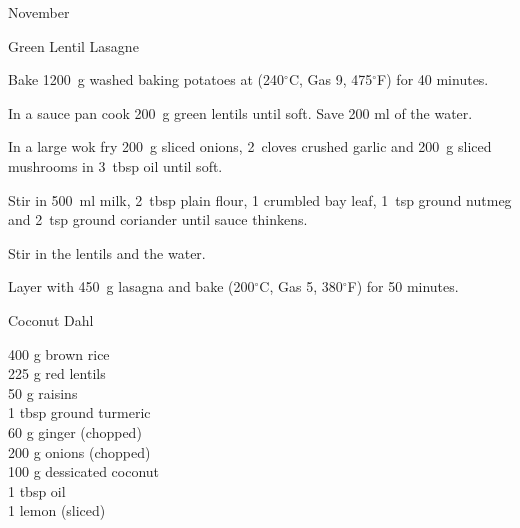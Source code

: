 \begin{menu}{November}
\begin{recipe}{2}{Green Lentil Lasagne}
    \begin{instructions}
    \item 
    Bake
    1200~g washed baking potatoes
    at
    (240$^{\circ}$C, Gas 9, 475$^{\circ}$F) for 40 minutes.
  \item 
        In a sauce pan cook
        200~g  green lentils
        until soft.
        Save 200 ml of the water.
      \item 
        In a large wok fry
        200~g sliced onions,
        2~cloves crushed garlic
        and
        200~g sliced mushrooms
        in
        3~tbsp  oil
        until soft.
      \item 
        Stir in
        500~ml  milk,
        2~tbsp  plain flour,
        1 crumbled bay leaf,
        1~tsp  ground nutmeg
        and
        2~tsp  ground coriander
        until sauce thinkens.
      \item 
        Stir in
        the lentils
        and
        the water.
      \item 
        Layer with
        450~g  lasagna
        and bake (200$^{\circ}$C, Gas 5, 380$^{\circ}$F) for 50 minutes.
      
    \end{instructions}
    \end{recipe}%
  
    \begin{recipe}{2}{Coconut Dahl}%
		\begin{ingredients}
		400 g brown rice  \\
	225 g red lentils  \\
	50 g raisins  \\
	1 tbsp ground turmeric  \\
	60 g ginger (chopped) \\
	200 g onions (chopped) \\
	100 g dessicated coconut  \\
	1 tbsp oil  \\
	1  lemon (sliced) \\
	
		\end{ingredients}
	
	
	

\end{recipe}
\end{menu}
